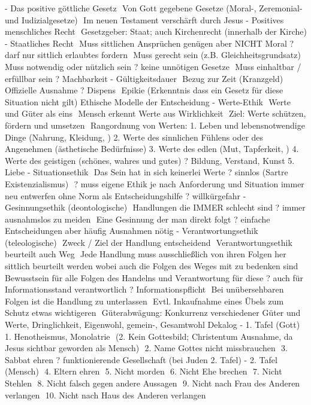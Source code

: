 \documentclass[11pt, paper=a4, twocolumn]{scrartcl}
\begin{document}
-	Das positive göttliche Gesetz
	Von Gott gegebene Gesetze (Moral-, Zeremonial- und Iudizialgesetze)
	Im neuen Testament verschärft durch Jesus
-	Positives menschliches Recht
	Gesetzgeber: Staat; auch Kirchenrecht (innerhalb der Kirche)
-	Staatliches Recht
	Muss sittlichen Ansprüchen genügen aber NICHT Moral
? darf nur sittlich erlaubtes fordern
	Muss gerecht sein
(z.B. Gleichheitsgrundsatz)
	Muss notwendig oder nützlich sein
? keine unnötigen Gesetze
	Muss einhaltbar / erfüllbar sein
? Machbarkeit
-	Gültigkeitsdauer
	Bezug zur Zeit (Kranzgeld)
	Offizielle Ausnahme ? Dispens
	Epikie (Erkenntnis dass ein Gesetz für diese Situation nicht gilt)
Ethische Modelle der Entscheidung
-	Werte-Ethik
	Werte und Güter als eins
	Mensch erkennt Werte aus Wirklichkeit
	Ziel: Werte schützen, fördern und umsetzen
	Rangordnung von Werten:
1.	Leben und lebensnotwendige Dinge (Nahrung, Kleidung, )
2.	Werte des sinnlichen Fühlens oder des Angenehmen (ästhetische Bedürfnisse)
3.	Werte des edlen (Mut, Tapferkeit, )
4.	Werte des geistigen (schönes, wahres und gutes) ? Bildung, Verstand, Kunst
5.	Liebe
-	Situationsethik
	Das Sein hat in sich keinerlei Werte
? sinnlos (Sartre  Existenzialismus)
	? muss eigene Ethik je nach Anforderung und Situation immer neu entwerfen ohne Norm als Entscheidungshilfe
? willkürgefahr
-	Gesinnungsethik (deontologische)
	Handlungen die IMMER schlecht sind
? immer ausnahmslos zu meiden
	Eine Gesinnung der man direkt folgt
? einfache Entscheidungen aber häufig Ausnahmen nötig
-	Verantwortungsethik (teleologische)
	Zweck / Ziel der Handlung entscheidend
	Verantwortungsethik beurteilt auch Weg
	Jede Handlung muss ausschließlich von ihren Folgen her sittlich beurteilt werden wobei auch die Folgen des Weges mit zu bedenken sind
	Bewusstsein für alle Folgen des Handelns und Verantwortung für diese
? auch für Informationsstand verantwortlich ? Informationspflicht
	Bei unübersehbaren Folgen ist die Handlung zu unterlassen
	Evtl. Inkaufnahme eines Übels zum Schutz etwas wichtigeren
	Güterabwägung: Konkurrenz verschiedener Güter und Werte, Dringlichkeit, Eigenwohl, gemein-, Gesamtwohl
Dekalog
-	1. Tafel (Gott)
	1. Henotheismus, Monolatrie
	(2. Kein Gottesbild; Christentum Ausnahme, da Jesus sichtbar geworden als Mensch)
	2. Name Gottes nicht missbrauchen
	3. Sabbat ehren ? funktionierende Gesellschaft (bei Juden 2. Tafel)
-	2. Tafel (Mensch)
	4. Eltern ehren
	5. Nicht morden
	6. Nicht Ehe brechen
	7. Nicht Stehlen
	8. Nicht falsch gegen andere Aussagen
	9. Nicht nach Frau des Anderen verlangen
	10. Nicht nach Haus des Anderen verlangen
\end{document}
